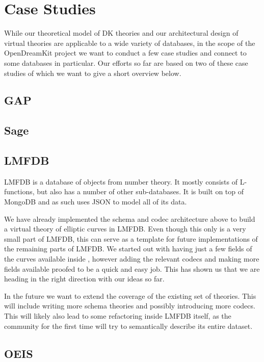 \section{Case Studies}\label{sec:cases}

While our theoretical model of DK theories and our architectural design of virtual
theories are applicable to a wide variety of databases, in the scope of the OpenDreamKit
project we want to conduct a few case studies and connect to some databases in
particular. Our efforts so far are based on two of these case studies of which we want to
give a short overview below.

\subsection{GAP}\label{sec:gap}

\subsection{Sage}\label{sec:sage}

\subsection{LMFDB}\label{sec:lmfdb}

LMFDB \cite{lmfdb} is a database of objects from number theory. It mostly consists of
L-functions, but also has a number of other sub-databases. It is built on top of MongoDB
and as such uses JSON to model all of its data.

We have already implemented the schema and codec architecture above to build a virtual
theory of elliptic curves in LMFDB. Even though this only is a very small part of LMFDB,
this can serve as a template for future implementations of the remaining parts of
LMFDB. We started out with having just a few fields of the curves available inside \MMT,
however adding the relevant codecs and making more fields available proofed to be a quick
and easy job. This has shown us that we are heading in the right direction with our ideas
so far.

In the future we want to extend the coverage of the existing set of theories. This will
include writing more schema theories and possibly introducing more codecs. This will
likely also lead to some refactoring inside LMFDB itself, as the community for the first
time will try to semantically describe its entire dataset.

\subsection{OEIS}

